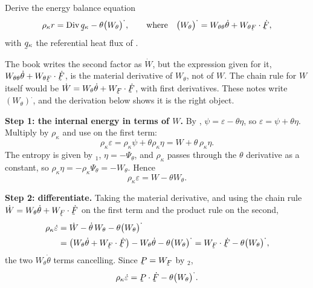 \begin{problem}
Derive the energy balance equation
\[
   \rho_{\kappa}r=\Dvg\bq_{\kappa}
   -\theta\big(W_{\theta}\big)^{\textstyle\cdot},
   \qquad\text{where}\quad
   \big(W_{\theta}\big)^{\textstyle\cdot}
   =W_{\theta\theta}\dot\theta+W_{\theta\bF}\cdot\dot\bF ,
\]
with $\bq_{\kappa}$ the referential heat flux of .
\end{problem}

\begin{solution}
\begin{remark}\label{rem:ch11dotW}
The book writes the second factor as $\dot W$, but the expression given
for it, $W_{\theta\theta}\dot\theta+W_{\theta\bF}\cdot\dot\bF$, is the
material derivative of $W_{\theta}$, not of $W$. The chain rule for $W$
itself would be $\dot W=W_{\theta}\dot\theta+W_{\bF}\cdot\dot\bF$, with
first derivatives. These notes write
$(W_{\theta})^{\textstyle\cdot}$, and the derivation below shows it is
the right object.
\end{remark}

\textbf{Step 1: the internal energy in terms of $W$.} By ,
$\psi=\varepsilon-\theta\eta$, so $\varepsilon=\psi+\theta\eta$.
Multiply by $\rho_{\kappa}$ and use  on the first term:
\[
   \rho_{\kappa}\varepsilon=\rho_{\kappa}\psi+\theta\rho_{\kappa}\eta
   =W+\theta\,\rho_{\kappa}\eta .
\]
The entropy is given by $_{1}$, $\eta=-\Psi_{\theta}$, and
$\rho_{\kappa}$ passes through the $\theta$ derivative as a constant,
so $\rho_{\kappa}\eta=-\rho_{\kappa}\Psi_{\theta}=-W_{\theta}$. Hence
\[
   \rho_{\kappa}\varepsilon=W-\theta W_{\theta} .
\]

\textbf{Step 2: differentiate.} Taking the material derivative, and
using the chain rule $\dot W=W_{\theta}\dot\theta+W_{\bF}\cdot\dot\bF$
on the first term and the product rule on the second,
\[
\begin{aligned}
   \rho_{\kappa}\dot\varepsilon
   &=\dot W-\dot\theta\,W_{\theta}
     -\theta\big(W_{\theta}\big)^{\textstyle\cdot}\\
   &=\big(W_{\theta}\dot\theta+W_{\bF}\cdot\dot\bF\big)
     -W_{\theta}\dot\theta-\theta\big(W_{\theta}\big)^{\textstyle\cdot}
   =W_{\bF}\cdot\dot\bF
     -\theta\big(W_{\theta}\big)^{\textstyle\cdot} ,
\end{aligned}
\]
the two $W_{\theta}\dot\theta$ terms cancelling. Since $\bP=W_{\bF}$ by
$_{2}$,
\[
   \rho_{\kappa}\dot\varepsilon
   =\bP\cdot\dot\bF-\theta\big(W_{\theta}\big)^{\textstyle\cdot} .
\]


\end{solution}
